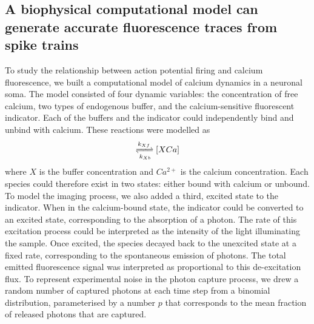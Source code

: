 \subsection{A biophysical computational model can generate accurate fluorescence traces from spike trains}
To study the relationship between action potential firing and calcium fluorescence, we built a computational model of calcium dynamics in a neuronal soma. The model consisted of four dynamic variables: the concentration of free calcium, two types of endogenous buffer, and the calcium-sensitive fluorescent indicator. Each of the buffers and the indicator could independently bind and unbind with calcium. These reactions were modelled as
\begin{align*}
   [X][Ca^{2+}] \xrightleftharpoons[k_{Xb}]{k_{Xf}} [XCa]
\end{align*}
where $X$ is the buffer concentration and $Ca^{2+}$ is the calcium concentration. Each species could therefore exist in two states: either bound with calcium or unbound. To model the imaging process, we also added a third, excited state to the indicator. When in the calcium-bound state, the indicator could be converted to an excited state, corresponding to the absorption of a photon. The rate of this excitation process could be interpreted as the intensity of the light illuminating the sample. Once excited, the species decayed back to the unexcited state at a fixed rate, corresponding to the spontaneous emission of photons. The total emitted fluorescence signal was interpreted as proportional to this de-excitation flux. To represent experimental noise in the photon capture process, we drew a random number of captured photons at each time step from a binomial distribution, parameterised by a number $p$ that corresponds to the mean fraction of released photons that are captured.

